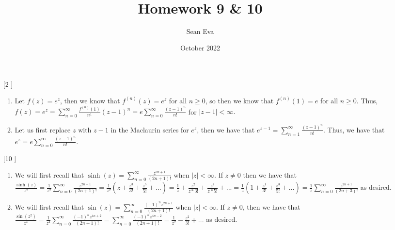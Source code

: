 \documentclass{article}
\title{Homework 9 \& 10}
\author{Sean Eva}
\date{October 2022}
\theoremstyle{definition}
\begin{document}
\maketitle

\begin{enumerate}
    \item [[\phantom{-}2]]
    
    \begin{enumerate}
        \item 
        
        Let $f(z) = e^z$, then we know that $f^{(n)}(z) = e^z$ for all $n\geq 0$, so then we know that $f^{(n)}(1) = e$ for all $n \geq 0$. Thus, $f(z) = e^z = \sum_{n = 0}^\infty \frac{f^{(n)}(1)}{n^1}(z-1)^n = e\sum_{n = 0}^\infty \frac{(z-1)^n}{n!}$ for $|z-1| < \infty.$
        
        \item
        
        Let us first replace $z$ with $z-1$ in the Maclaurin series for $e^z$, then we have that $e^{z-1} = \sum_{n = 1}^\infty \frac{(z-1)^n}{n!}$. Thus, we have that $e^z = e\sum_{n = 0}^\infty \frac{(z-1)^n}{n!}.$
        
    \end{enumerate}
    
    \item [[\phantom{-}10]]
    
    \begin{enumerate}
        \item 
        
        We will first recall that $\sinh(z) = \sum_{n = 0}^\infty \frac{z^{2n + 1}}{(2n + 1)!}$ when $|z| < \infty$. If $z \neq 0$ then we have that $\frac{\sinh(z)}{z^2} = \frac{1}{z^2}\sum_{n = 0}^\infty \frac{z^{2n + 1}}{(2n + 1)!} = \frac{1}{z^2}(z + \frac{z^3}{3!} + \frac{z^5}{5!} + ...) = \frac{1}{z} + \frac{z^2}{z*3!} + \frac{z^4}{z*5!} + ... = \frac{1}{z}(1 + \frac{z^1}{3!} + \frac{z^3}{5!} + ...) = \frac{1}{z}\sum_{n = 0}^\infty \frac{z^{2n + 1}}{(2n + 3)!}$ as desired.
        
        \item
        
        We will first recall that $\sin(z) = \sum_{n = 0}^\infty \frac{(-1)^nz^{2n + 1}}{(2n + 1)!}$ when $|z| < \infty$. If $z \neq 0$, then we have that $\frac{\sin(z^2)}{z^4} = \frac{1}{z^4}\sum_{n = 0}^\infty \frac{(-1)^nz^{4n + 2}}{(2n + 1)!} = \sum_{n = 0}^\infty \frac{(-1)^nz^{4n - 2}}{(2n + 1)!} = \frac{1}{z^2} - \frac{z^2}{3!} +...$ as desired.
        

\end{enumerate}
\end{enumerate}
\end{document}
